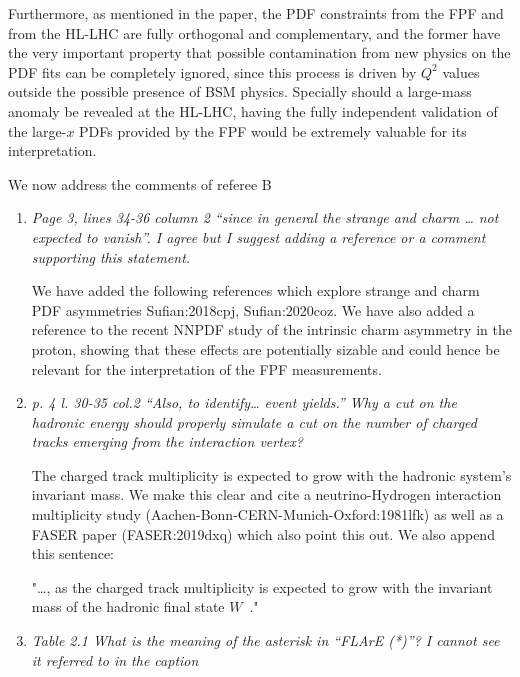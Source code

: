 \documentclass[11pt,a4paper]{article}
\begin{document}
\begin{enumerate}
        Furthermore, as mentioned in the paper, the PDF constraints from the FPF and from the HL-LHC are
        fully orthogonal and complementary, and the former have the very important property that
        possible contamination from new physics on the PDF fits can be completely ignored, since
        this process is driven by $Q^2$ values outside the possible presence of BSM physics.
        Specially should a large-mass anomaly be revealed at the HL-LHC, having the fully independent
        validation of the large-$x$ PDFs provided by the FPF would be extremely valuable for its
        interpretation.

\end{enumerate}

\noindent
We now address the comments of referee B

\begin{enumerate}
\item{\it Page 3, lines 34-36 column 2 “since in general the strange and charm … not expected to vanish”. I agree but I suggest adding a reference or a comment supporting this statement. }

  We have added the following references which explore strange and charm PDF asymmetries Sufian:2018cpj, Sufian:2020coz.
  We have also added a reference to the recent NNPDF study of the intrinsic charm asymmetry in the proton,
  showing that these effects are potentially sizable and could hence be relevant for the interpretation
  of the FPF measurements.

\item{\it p. 4 l. 30-35 col.2 “Also, to identify… event yields.” Why a cut on the hadronic energy should properly simulate a cut on the number of charged tracks emerging from the interaction vertex?}

The charged track multiplicity is expected to grow with the hadronic system’s invariant mass. We make this clear and cite a neutrino-Hydrogen interaction multiplicity study (Aachen-Bonn-CERN-Munich-Oxford:1981lfk) as well as a FASER paper (FASER:2019dxq) which also point this out. We also append this sentence:

"…, as the charged track multiplicity is expected to grow with the invariant mass of the hadronic
final state $W$~\cite{Aachen-Bonn-CERN-Munich-Oxford:1981lfk,FASER:2019dxq}."


\item{\it Table 2.1 What is the meaning of the asterisk in “FLArE (*)”? I cannot see it referred to in the caption} 


\end{enumerate}
\end{document}

